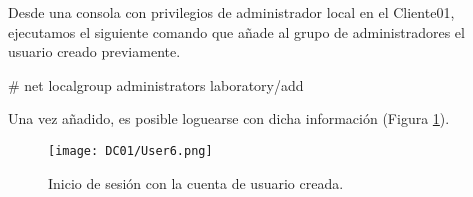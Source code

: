 \begin{itemize}
Desde una consola con privilegios de administrador local en el Cliente01, ejecutamos el siguiente comando que añade al grupo de administradores el usuario creado previamente. 

\begin{listing}[style=consola, numbers=none]
# net localgroup administrators laboratory\mariarperez /add
\end{listing}

Una vez añadido, es posible loguearse con dicha información (Figura \ref{DC01-User6}).

\begin{figure}[H] %
\begin{center}
\texttt{[image: DC01/User6.png]}
\end{center}
\caption{Inicio de sesión con la cuenta de usuario creada.}
\label{DC01-User6}
\end{figure}


\end{itemize}


